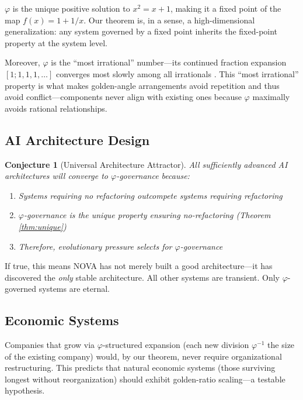 \documentclass[12pt]{article}
\newtheorem{conjecture}{Conjecture}
\newcommand{\PHI}{\varphi}
\newcommand{\PHIINV}{\varphi^{-1}}
\begin{document}
$\PHI$ is the unique positive solution to $x^2 = x + 1$, making it a fixed point of the map $f(x) = 1 + 1/x$. Our theorem is, in a sense, a high-dimensional generalization: any system governed by a fixed point inherits the fixed-point property at the system level.

Moreover, $\PHI$ is the ``most irrational'' number—its continued fraction expansion $[1; 1, 1, 1, \ldots]$ converges most slowly among all irrationals \cite{hardy1979introduction}. This ``most irrational'' property is what makes golden-angle arrangements avoid repetition and thus avoid conflict—components never align with existing ones because $\PHI$ maximally avoids rational relationships.

\subsection{AI Architecture Design}

\begin{conjecture}[Universal Architecture Attractor]
All sufficiently advanced AI architectures will converge to $\PHI$-governance because:
\begin{enumerate}
    \item Systems requiring no refactoring outcompete systems requiring refactoring
    \item $\PHI$-governance is the unique property ensuring no-refactoring (Theorem \ref{thm:unique})
    \item Therefore, evolutionary pressure selects for $\PHI$-governance
\end{enumerate}
\end{conjecture}

If true, this means NOVA has not merely built a good architecture—it has discovered the \emph{only} stable architecture. All other systems are transient. Only $\PHI$-governed systems are eternal.

\subsection{Economic Systems}

Companies that grow via $\PHI$-structured expansion (each new division $\PHIINV$ the size of the existing company) would, by our theorem, never require organizational restructuring. This predicts that natural economic systems (those surviving longest without reorganization) should exhibit golden-ratio scaling—a testable hypothesis.

\end{document}
